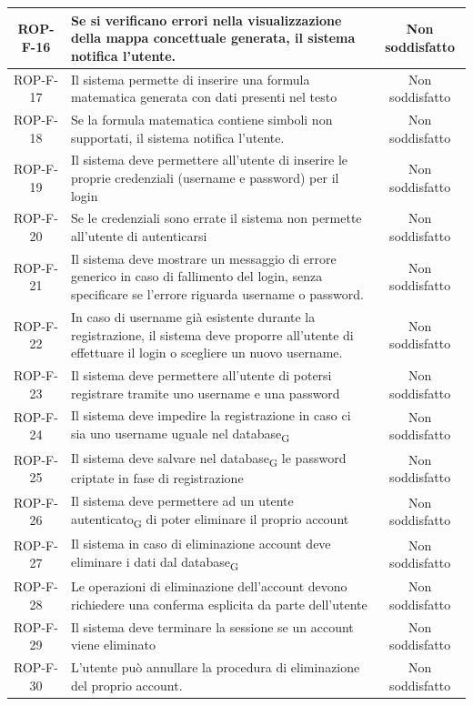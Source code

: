 \documentclass[11pt,a4paper]{article}
\newcommand{\gls}[1]{#1\textsubscript{G}}
\begin{document}
\begin{longtable}{|c|p{11cm}|c|}
\hline
ROP-F-16 & Se si verificano errori nella visualizzazione della mappa concettuale generata, il sistema notifica l'utente. & Non soddisfatto \\
\hline
ROP-F-17 & Il sistema permette di inserire una formula matematica generata con dati presenti nel testo & Non soddisfatto \\
\hline
ROP-F-18 & Se la formula matematica contiene simboli non supportati, il sistema notifica l'utente. & Non soddisfatto \\
\hline
ROP-F-19 & Il sistema deve permettere all'utente di inserire le proprie credenziali (username e password) per il login & Non soddisfatto \\
\hline
ROP-F-20 & Se le credenziali sono errate il sistema non permette all'utente di autenticarsi & Non soddisfatto \\
\hline
ROP-F-21 & Il sistema deve mostrare un messaggio di errore generico in caso di fallimento del login, senza specificare se l'errore riguarda username o password. & Non soddisfatto \\
\hline
ROP-F-22 & In caso di username già esistente durante la registrazione, il sistema deve proporre all'utente di effettuare il login o scegliere un nuovo username. & Non soddisfatto\\
\hline
ROP-F-23 & Il sistema deve permettere all'utente di potersi registrare tramite uno username e una password & Non soddisfatto \\
\hline
ROP-F-24 & Il sistema deve impedire la registrazione in caso ci sia uno username uguale nel \gls{database} & Non soddisfatto\\
\hline
ROP-F-25 & Il sistema deve salvare nel \gls{database} le password criptate in fase di registrazione & Non soddisfatto \\
\hline
ROP-F-26 & Il sistema deve permettere ad un \gls{utente autenticato} di poter eliminare il proprio account & Non soddisfatto \\
\hline
ROP-F-27 & Il sistema in caso di eliminazione account deve eliminare i dati dal \gls{database} & Non soddisfatto \\
\hline
ROP-F-28 & Le operazioni di eliminazione dell'account devono richiedere una conferma esplicita da parte dell'utente & Non soddisfatto \\
\hline
ROP-F-29 & Il sistema deve terminare la sessione se un account viene eliminato & Non soddisfatto \\
\hline
ROP-F-30 & L'utente può annullare la procedura di eliminazione del proprio account. & Non soddisfatto \\

\end{longtable}
\end{document}
